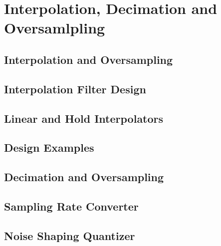 \section{Interpolation, Decimation and Oversamlpling}
\subsection{Interpolation and Oversampling}
\subsection{Interpolation Filter Design} %
\subsection{Linear and Hold Interpolators} %
\subsection{Design Examples}
\subsection{Decimation and Oversampling}
\subsection{Sampling Rate Converter}
\subsection{Noise Shaping Quantizer}



